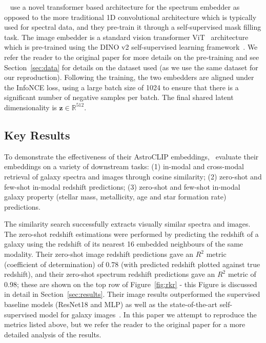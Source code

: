 ~\cite{astroclip} use a novel transformer based architecture for the spectrum embedder as opposed to the more traditional
1D convolutional architecture which is typically used for spectral data, and they pre-train it through a self-supervised
mask filling task.
The image embedder is a standard vision transformer ViT~\citep{dosovitskiy2021} architecture which is pre-trained using
the DINO v2 self-supervised learning framework~\citep{oquab2024}.
We refer the reader to the original paper for more details on the pre-training and see Section~\eqref{sec:data} for details
on the dataset used (as we use the same dataset for our reproduction).
Following the training, the two embedders are aligned under the InfoNCE loss, using a large batch size of 1024 to ensure
that there is a significant number of negative samples per batch.
The final shared latent dimensionality is $\mathbf{z} \in \mathbb{R}^{512}$.

\subsection{Key Results}\label{subsec:original-paper-key-results}
To demonstrate the effectiveness of their AstroCLIP embeddings,~\cite{astroclip} evaluate their embeddings on a variety
of downstream tasks: (1) in-modal and cross-modal retrieval of galaxy spectra and images through cosine similarity; (2)
zero-shot and few-shot in-modal redshift predictions; (3) zero-shot and few-shot in-modal galaxy property
(stellar mass, metallicity, age and star formation rate) predictions.

The similarity search successfully extracts visually similar spectra and images.
The zero-shot redshift estimations were performed by predicting the redshift of a galaxy using the redshift of its nearest
16 embedded neighbours of the same modality.
Their zero-shot image redshift predictions gave an $R^{2}$ metric (coefficient of determination) of 0.78 (with predicted
redshift plotted against true redshift), and their zero-shot spectrum redshift predictions gave an $R^{2}$ metric of 0.98;
these are shown on the top row of Figure~\eqref{fig:rkr} - this Figure is discussed in detail in Section~\eqref{sec:results}.
Their image results outperformed the supervised baseline models (ResNet18 and MLP) as well as the state-of-the-art
self-supervised model for galaxy images~\citep{stein2021}.
In this paper we attempt to reproduce the metrics listed above, but we refer the reader to the original paper for a
more detailed analysis of the results.
